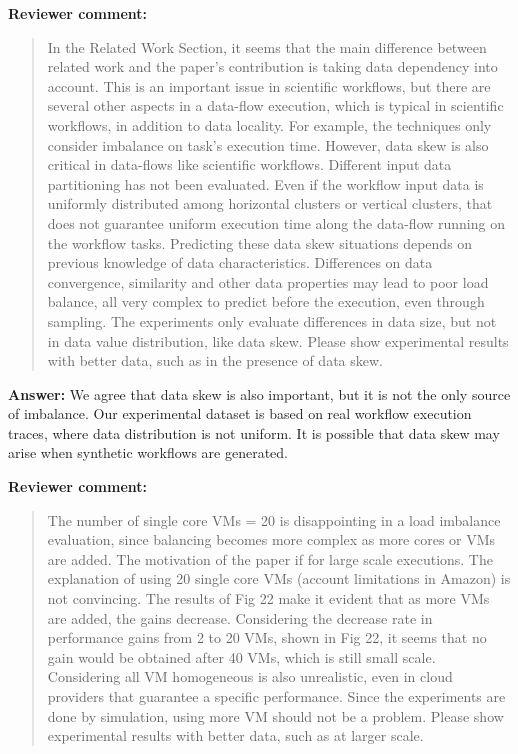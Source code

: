 \documentclass{letter}
\newenvironment{review}%
{\textbf{Reviewer comment:}\begin{quote}}%
{\end{quote}}%
\newcommand{\answer}[1]{%
      \textbf{Answer:} #1}
\begin{document}
\begin{letter}{}
\begin{review}
In the Related Work Section, it seems that the main difference between related work and the paper's contribution is taking data dependency into account. This is an important issue in scientific workflows, but there are several other aspects in a data-flow execution, which is typical in scientific workflows, in addition to data locality. For example, the techniques only consider imbalance on task's execution time. However, data skew is also critical in data-flows like scientific workflows. Different input data partitioning has not been evaluated. Even if the workflow input data is uniformly distributed among horizontal clusters or vertical clusters, that does not guarantee uniform execution time along the data-flow running on the workflow tasks. Predicting these data skew situations depends on previous knowledge of data characteristics. Differences on data convergence, similarity and other data properties may lead to poor load balance, all very complex to predict before the execution, even through sampling. The experiments only evaluate differences in data size, but not in data value distribution, like data skew. Please show experimental results with better data, such as in the presence of data skew.
\end{review}

\answer{We agree that data skew is also important, but it is not the only source of imbalance. Our experimental dataset is based on real workflow execution traces, {where }data distribution is not uniform. It is possible that data skew may arise when synthetic workflows are generated.}


\begin{review}
The number of single core VMs = 20 is disappointing in a load imbalance evaluation, since balancing becomes more complex as more cores or VMs are added. The motivation of the paper if for large scale executions. The explanation of using 20 single core VMs (account limitations in Amazon) is not convincing. The results of Fig 22 make it evident that as more VMs are added, the gains decrease. Considering the decrease rate in performance gains from 2 to 20 VMs, shown in Fig 22, it seems that no gain would be obtained after 40 VMs, which is still small scale. Considering all VM homogeneous is also unrealistic, even in cloud providers that guarantee a specific performance. Since the experiments are done by simulation, using more VM should not be a problem. Please show experimental results with better data, such as at larger scale. 
\end{review}


\end{letter}
\end{document}
